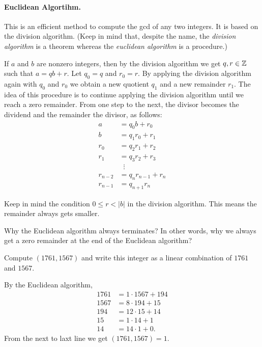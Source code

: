 \documentclass[11pt,a5paper]{article}
\begin{document}
\paragraph{Euclidean Algortihm.} This is an efficient method to compute the gcd of any  two integers.
It is based on the division algorithm.
(Keep in mind that, despite the name, the \textit{division algorithm} is a theorem whereas the \textit{euclidean algorithm} is a procedure.)

If \(a\) and \(b\) are nonzero integers, then by the division algorithm we get \(q,r\in \mathbb{Z}\) such that \(a= qb+r\).
Let \(q_0=q\) and \(r_0=r\).
By applying the division algorithm again with \(q_0\) and \(r_0\) we obtain a new quotient \(q_1\)   and a new remainder \(r_1\).
The idea of this procedure is to continue applying the division algorithm until we reach a zero remainder. From one step to the next,  the divisor becomes the dividend and the remainder the divisor, as follows:
\begin{align*}
a & =q_0 b+r_0 \\
b & =q_1 r_0+r_1 \\
r_0 & =q_2 r_1+r_2 \\
r_1 & =q_3 r_2+r_3 \\
&\;\; \vdots \\
r_{n-2} & =q_n r_{n-1}+r_n \\
r_{n-1} & =q_{n+1} r_n
\end{align*}

\begin{rem}
    Keep in mind the condition \(0\leq r < |b|\) in the division algorithm.
    This means the remainder always gets smaller.
\end{rem}

\begin{que}
    Why the Euclidean algorithm always terminates? In other words,
    why we always get a zero remainder at the end of the Euclidean algorithm?
\end{que}

\begin{eje}
    Compute \((1761, 1567)\) and write this integer as a linear combination of \(1761\) and \(1567\).
\end{eje}

\begin{sol} By the Euclidean algorithm,
   \begin{align*}
    1761 &= 1\cdot 1567 + 194\\
    1567 &= 8\cdot194 + 15\\
    194  &= 12\cdot 15 + 14\\
    15   &= 1\cdot 14 + 1 \\
    14   &= 14\cdot 1 + 0.
   \end{align*}
   From the next to laxt line we get \((1761,1567) = 1\).
\end{sol}
\end{document}
